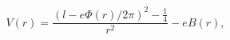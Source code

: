 \begin{equation}
\label{Eq_0232}
V(r) = \frac{(l - e\Phi(r)/2\pi)^2 - \frac{1}{4}}{r^2} - eB(r),
\end{equation}

